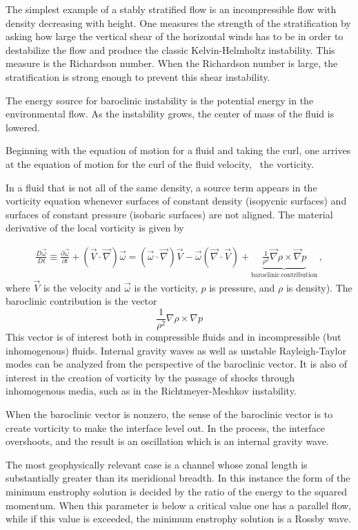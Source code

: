 The simplest example of a stably stratified flow is an incompressible
flow with density decreasing with height. One measures the strength of
the stratification by asking how large the vertical shear of the
horizontal winds has to be in order to destabilize the flow and produce
the classic Kelvin-Helmholtz instability. This measure is the Richardson
number. When the Richardson number is large, the stratification is strong
enough to prevent this shear instability.

The energy source for baroclinic instability is the potential energy in
the environmental flow. As the instability grows, the center of mass of
the fluid is lowered.

Beginning with the equation of motion for a fluid and taking the curl,
one arrives at the equation of motion for the curl of the fluid velocity,
\ie\ the vorticity.

In a fluid that is not all of the same density, a source term appears in
the vorticity equation whenever surfaces of constant density
(isopycnic surfaces) and surfaces of constant pressure (isobaric
surfaces) are not aligned. The material derivative of the local
vorticity is given by

\begin{align}
\frac{D\vec\omega}{Dt} \equiv \frac{\partial \vec \omega}{\partial t}
 + (\vec V \cdot \vec \nabla) \vec \omega
    =
(\vec \omega \cdot \vec \nabla) \vec V - \vec \omega (\vec \nabla \cdot \vec V)
 + \underbrace{\frac{1}{\rho^2}\vec \nabla \rho \times \vec \nabla p
   }_{\mathrm{baroclinic \, contribution}}
\,,
\end{align}
where $\vec V$ is the velocity and $\vec \omega$ is the
vorticity, $ p $ is pressure, and $ \rho $ is density). The
baroclinic contribution is the vector
\[
\frac{1}{\rho^2} \nabla \rho \times \nabla p
\]
This vector is of interest both in compressible fluids and in
incompressible (but inhomogenous) fluids. Internal gravity waves as
well as unstable Rayleigh-Taylor modes can be analyzed from the
perspective of the baroclinic vector. It is also of interest in the
creation of vorticity by the passage of shocks through inhomogenous
media, such as in the Richtmeyer-Meshkov instability.

When the baroclinic
vector is nonzero, the sense of the baroclinic vector is to create
vorticity to make the interface level out. In the process, the interface
overshoots, and the result is an oscillation which is an internal gravity
wave.

The most
geophysically relevant case is a channel whose zonal length is
substantially greater than its meridional breadth. In this instance the
form of the minimum enstrophy solution is decided by the ratio of the
energy to the squared momentum. When this parameter is below a critical
value one has a parallel flow, while if this value is exceeded, the
minimum enstrophy solution is a Rossby wave.

